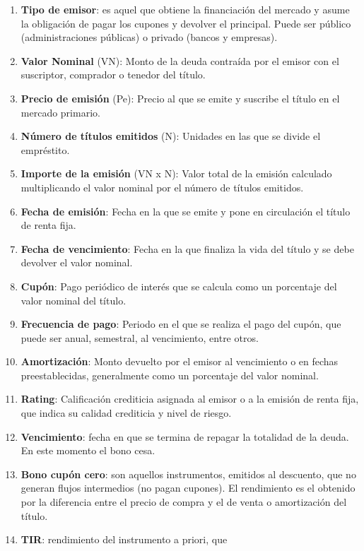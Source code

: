\documentclass[
  letterpaper,
  DIV=11,
  numbers=noendperiod]{scrreprt}
\begin{document}
\begin{tcolorbox}
\begin{enumerate}
\def\labelenumi{\arabic{enumi}.}
\item
  \textbf{Tipo de emisor}: es aquel que obtiene la financiación del
  mercado y asume la obligación de pagar los cupones y devolver el
  principal. Puede ser público (administraciones públicas) o privado
  (bancos y empresas).
\item
  \textbf{Valor Nominal} (VN): Monto de la deuda contraída por el emisor
  con el suscriptor, comprador o tenedor del título.
\item
  \textbf{Precio de emisión} (Pe): Precio al que se emite y suscribe el
  título en el mercado primario.
\item
  \textbf{Número de títulos emitidos} (N): Unidades en las que se divide
  el empréstito.
\item
  \textbf{Importe de la emisión} (VN x N): Valor total de la emisión
  calculado multiplicando el valor nominal por el número de títulos
  emitidos.
\item
  \textbf{Fecha de emisión}: Fecha en la que se emite y pone en
  circulación el título de renta fija.
\item
  \textbf{Fecha de vencimiento}: Fecha en la que finaliza la vida del
  título y se debe devolver el valor nominal.
\item
  \textbf{Cupón}: Pago periódico de interés que se calcula como un
  porcentaje del valor nominal del título.
\item
  \textbf{Frecuencia de pago}: Periodo en el que se realiza el pago del
  cupón, que puede ser anual, semestral, al vencimiento, entre otros.
\item
  \textbf{Amortización}: Monto devuelto por el emisor al vencimiento o
  en fechas preestablecidas, generalmente como un porcentaje del valor
  nominal.
\item
  \textbf{Rating}: Calificación crediticia asignada al emisor o a la
  emisión de renta fija, que indica su calidad crediticia y nivel de
  riesgo.
\item
  \textbf{Vencimiento}: fecha en que se termina de repagar la totalidad
  de la deuda. En este momento el bono cesa.
\item
  \textbf{Bono cupón cero}: son aquellos instrumentos, emitidos al
  descuento, que no generan flujos intermedios (no pagan cupones). El
  rendimiento es el obtenido por la diferencia entre el precio de compra
  y el de venta o amortización del título.
\item
  \textbf{TIR}: rendimiento del instrumento a priori, que

\end{enumerate}
\end{tcolorbox}
\end{document}
